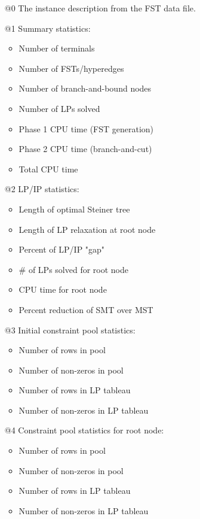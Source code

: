 \documentclass[12pt,twoside,letterpaper]{article}
\def\code#1{{\ttfamily #1}}
\begin{document}
\bigskip
\begin{itemize}

\item[\code{@0}] The instance description from the FST data file.\\

\item[\code{@1}] Summary statistics:
 \begin{itemize}
  \item Number of terminals
  \item Number of FSTs/hyperedges
  \item Number of branch-and-bound nodes
  \item Number of LPs solved
  \item Phase 1 CPU time (FST generation)
  \item Phase 2 CPU time (branch-and-cut)
  \item Total CPU time
\end{itemize}

\item[\code{@2}] LP/IP statistics:
 \begin{itemize}
  \item Length of optimal Steiner tree
  \item Length of LP relaxation at root node
  \item Percent of LP/IP "gap"
  \item \# of LPs solved for root node
  \item CPU time for root node
  \item Percent reduction of SMT over MST
\end{itemize}

\item[\code{@3}]        Initial constraint pool statistics:
 \begin{itemize}
  \item Number of rows in pool
  \item Number of non-zeros in pool
  \item Number of rows in LP tableau
  \item Number of non-zeros in LP tableau
\end{itemize}

\item[\code{@4}]        Constraint pool statistics for root node:
 \begin{itemize}
  \item Number of rows in pool
  \item Number of non-zeros in pool
  \item Number of rows in LP tableau
  \item Number of non-zeros in LP tableau
\end{itemize}


\end{itemize}
\end{document}
